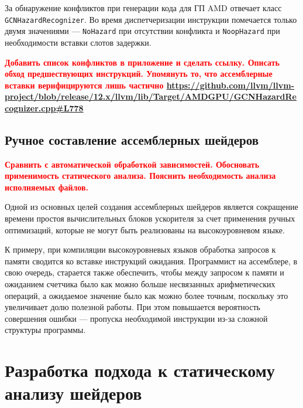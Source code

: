 \documentclass[a4paper,14pt]{extarticle}
\newcommand{\todo}[1]{\textbf{\textcolor{red}{#1}}}
\begin{document}
{За обнаружение конфликтов при генерации кода для ГП AMD отвечает класс \verb|GCNHazardRecognizer|.
Во время диспетчеризации инструкции помечается только двумя значениями — \verb|NoHazard| при
отсутствии конфликта и \verb|NoopHazard| при необходимости вставки слотов задержки.

\todo{Добавить список конфликтов в приложение и сделать ссылку. Описать обход предшествующих инструкций.
Упомянуть то, что ассемблерные вставки верифицируются лишь частично \url{https://github.com/llvm/llvm-project/blob/release/12.x/llvm/lib/Target/AMDGPU/GCNHazardRecognizer.cpp\#L778}}

\subsection{Ручное составление ассемблерных шейдеров}

\todo{Сравнить с автоматической обработкой зависимостей. Обосновать применимость
статического анализа. Пояснить необходимость анализа исполняемых файлов.}

Одной из основных целей создания ассемблерных шейдеров является сокращение
времени простоя вычислительных блоков ускорителя за счет применения ручных оптимизаций,
которые не могут быть реализованы на высокоуровневом языке.

К примеру, при компиляции высокоуровневых языков обработка запросов к памяти сводится ко вставке
инструкций ожидания. Программист на ассемблере, в свою очередь, старается также обеспечить,
чтобы между запросом к памяти и ожиданием счетчика было как можно больше несвязанных
арифметических операций, а ожидаемое значение было как можно более точным, поскольку
это увеличивает долю полезной работы. При этом повышается вероятность совершения
ошибки — пропуска необходимой инструкции из-за сложной структуры программы.

%
%

\section{Разработка подхода к статическому анализу шейдеров}
\label{section:algorithms}

}
\end{document}
